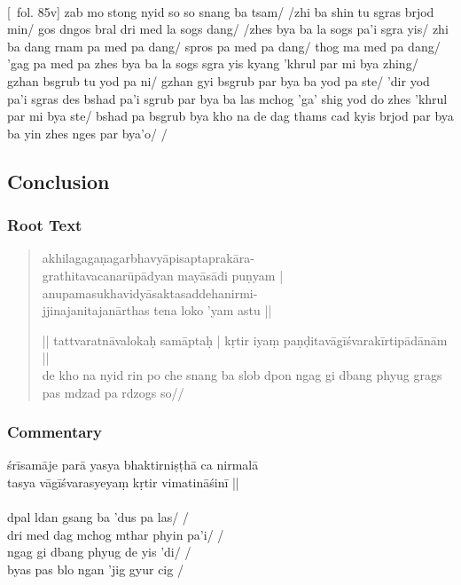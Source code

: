 \documentclass[12pt]{article}
\begin{document}
\textbf{\TVB}\\
{[}\TVB\ fol. 85v{]} zab mo stong nyid so so snang ba tsam/ /zhi ba shin tu sgras brjod min/ gos dngos bral dri med la sogs dang/ /zhes bya ba la sogs pa'i sgra yis/ zhi ba dang rnam pa med pa dang/ spros pa med pa dang/ thog ma med pa dang/ 'gag pa med pa zhes bya ba la sogs sgra yis kyang 'khrul par mi bya zhing/ gzhan bsgrub tu yod pa ni/ gzhan gyi bsgrub par bya ba yod pa ste/ 'dir yod pa'i sgras des bshad pa'i sgrub par bya ba las mchog 'ga' shig yod do zhes 'khrul par mi bya ste/ bshad pa bsgrub bya kho na de dag thams cad kyis brjod par bya ba yin zhes nges par bya'o/ /\\

\subsection{Conclusion}
\subsubsection{Root Text}
\begin{quote}
	akhilagagaṇagarbhavyāpisaptaprakāra\footnoteB{
		°saptaprakāra°] \EDD ; °sarvaprakāra° \MS
	}-\\
	grathitavacanarūpādyan mayāsādi puṇyam |\\
	anupamasukhavidyāsaktasaddehanirmi-\\
	jjinajanitajanārthas tena loko 'yam astu ||

	|| tattvaratnāvalokaḥ samāptaḥ | kṛtir iyaṃ paṇḍitavāgīśvarakīrtipādānām ||\\

	de kho na nyid rin po che snang ba slob dpon ngag gi dbang phyug grags pas mdzad pa rdzogs so// 
\end{quote}

\subsubsection{Commentary}
śrīsamāje parā yasya bhaktirniṣṭhā ca nirmalā\\
tasya vāgīśvarasyeyaṃ kṛtir vimatināśinī ||\\

\textbf{\TVA}\\
dpal ldan gsang ba 'dus pa las/ /\\
dri med dag mchog mthar phyin pa'i/ /\\
ngag gi dbang phyug de yis 'di/ /\\
byas pas blo ngan 'jig gyur cig /\\
\end{document}
